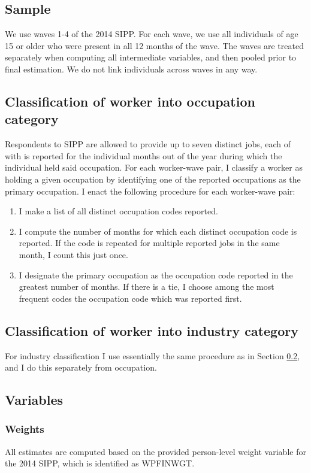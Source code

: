 \documentclass{article}
\begin{document}
\subsection{Sample}
We use waves 1-4 of the 2014 SIPP. For each wave, we use all individuals of age 15 or older who were present in all 12 months of the wave. The waves are treated separately when computing all intermediate variables, and then pooled prior to final estimation. We do not link individuals across waves in any way.

\subsection{Classification of worker into occupation category}
\label{sipp_occupation}
Respondents to SIPP are allowed to provide up to seven distinct jobs, each of with is reported for the individual months out of the year during which the individual held said occupation.
For each worker-wave pair, I classify a worker as holding a given occupation by identifying one of the reported occupations as the primary occupation. I enact the following procedure for each worker-wave pair:
\begin{enumerate}
\item I make a list of all distinct occupation codes reported.
\item I compute the number of months for which each distinct occupation code is reported. If the code is repeated for multiple reported jobs in the same month, I count this just once.
\item I designate the primary occupation as the occupation code reported in the greatest number of months. If there is a tie, I choose among the most frequent codes the occupation code which was reported first.
\end{enumerate}

\subsection{Classification of worker into industry category}
For industry classification I use essentially the same procedure as in Section \ref{sipp_occupation}, and I do this separately from occupation.

\subsection{Variables}

\subsubsection{Weights}
All estimates are computed based on the provided person-level weight variable for the 2014 SIPP, which is identified as WPFINWGT.
\end{document}
